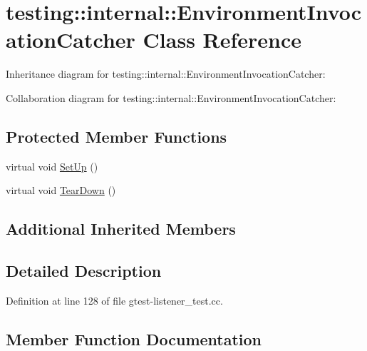 \hypertarget{classtesting_1_1internal_1_1_environment_invocation_catcher}{}\section{testing\+:\+:internal\+:\+:Environment\+Invocation\+Catcher Class Reference}
\label{classtesting_1_1internal_1_1_environment_invocation_catcher}


Inheritance diagram for testing\+:\+:internal\+:\+:Environment\+Invocation\+Catcher\+:


Collaboration diagram for testing\+:\+:internal\+:\+:Environment\+Invocation\+Catcher\+:
\subsection*{Protected Member Functions}
\begin{DoxyCompactItemize}
\item 
virtual void \hyperlink{classtesting_1_1internal_1_1_environment_invocation_catcher_a325365b0ecfa71a4a767d7a1817c9663}{Set\+Up} ()
\item 
virtual void \hyperlink{classtesting_1_1internal_1_1_environment_invocation_catcher_afc89ee0a8e32e6746a89fcc1682f62e9}{Tear\+Down} ()
\end{DoxyCompactItemize}
\subsection*{Additional Inherited Members}


\subsection{Detailed Description}


Definition at line 128 of file gtest-\/listener\+\_\+test.\+cc.



\subsection{Member Function Documentation}
